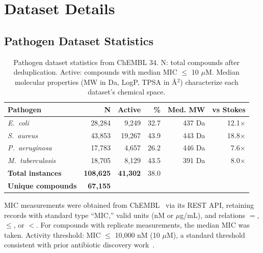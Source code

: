 \documentclass{article}
\begin{document}
\newpage
\appendix
\renewcommand{\appendixname}{Supplementary Material}

\section{Dataset Details}
\label{app:data}

\subsection{Pathogen Dataset Statistics}

\begin{table}[ht]
\caption{Pathogen dataset statistics from ChEMBL 34. N: total compounds after deduplication. Active: compounds with median MIC $\leq$ 10 $\mu$M. Median molecular properties (MW in Da, LogP, TPSA in \AA$^2$) characterize each dataset's chemical space.}
\label{tab:pathogen_detail}
\centering
\scriptsize
\setlength{\tabcolsep}{3pt}
\begin{tabular}{lrrrrr}
\toprule
\textbf{Pathogen} & \textbf{N} & \textbf{Active} & \textbf{\%} & \textbf{Med. MW} & \textbf{vs Stokes} \\
\midrule
\textit{E.~coli}         & 28,284 & 9,249  & 32.7 & 437 Da & 12.1$\times$ \\
\textit{S.~aureus}       & 43,853 & 19,267 & 43.9 & 443 Da & 18.8$\times$ \\
\textit{P.~aeruginosa}   & 17,783 & 4,657  & 26.2 & 446 Da & 7.6$\times$ \\
\textit{M.~tuberculosis} & 18,705 & 8,129  & 43.5 & 391 Da & 8.0$\times$ \\
\midrule
\textbf{Total instances}  & \textbf{108,625} & \textbf{41,302} & 38.0 & & \\
\textbf{Unique compounds} & \textbf{67,155} & & & & \\
\bottomrule
\end{tabular}
\end{table}

MIC measurements were obtained from ChEMBL~\citep{chembl34} via its REST API, retaining records with standard type ``MIC,'' valid units (nM or $\mu$g/mL), and relations $=$, $\leq$, or $<$.
For compounds with replicate measurements, the median MIC was taken.
Activity threshold: MIC $\leq$ 10,000 nM (10 $\mu$M), a standard threshold consistent with prior antibiotic discovery work~\citep{stokes2020,wong2024}.
\end{document}
